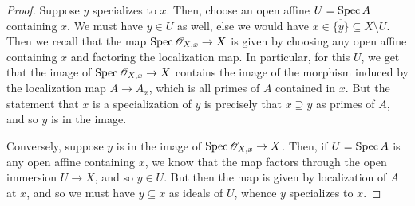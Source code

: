 \begin{proof}
	Suppose $y$ specializes to $x$. Then, choose an open affine $U = \operatorname{Spec} A$ containing $x$. We must have $y \in U$ as well, else we would have $x \in \overline{\{y\}} \subseteq X \setminus U$. Then we recall that the map $\operatorname{Spec}\mathscr{O}_{X,x} \to X$ is given by choosing any open affine containing $x$ and factoring the localization map. In particular, for this $U$, we get that the image of $\operatorname{Spec}\mathscr{O}_{X,x} \to X$ contains the image of the morphism induced by the localization map $A \to A_x$, which is all primes of $A$ contained in $x$. But the statement that $x$ is a specialization of $y$ is precisely that $x \supseteq y$ as primes of $A$, and so $y$ is in the image.
	
	Conversely, suppose $y$ is in the image of $\operatorname{Spec}\mathscr{O}_{X,x} \to X$. Then, if $U = \operatorname{Spec} A$ is any open affine containing $x$, we know that the map factors through the open immersion $U \to X$, and so $y \in U$. But then the map is given by localization of $A$ at $x$, and so we must have $y \subseteq x$ as ideals of $U$, whence $y$ specializes to $x$. 
\end{proof}
